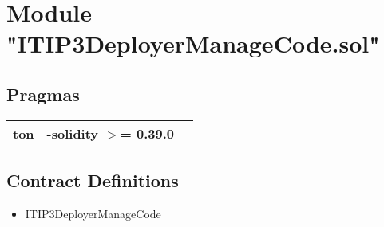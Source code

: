 
\section{Module "ITIP3DeployerManageCode.sol"}


\subsection{Pragmas}


\noindent\begin{tabular}{|l|l|p{5cm}|}\hline
ton & -solidity $>$= 0.39.0 &\\\hline
\end{tabular}


\subsection{Contract Definitions}

\begin{itemize}
\item ITIP3DeployerManageCode
\end{itemize}
